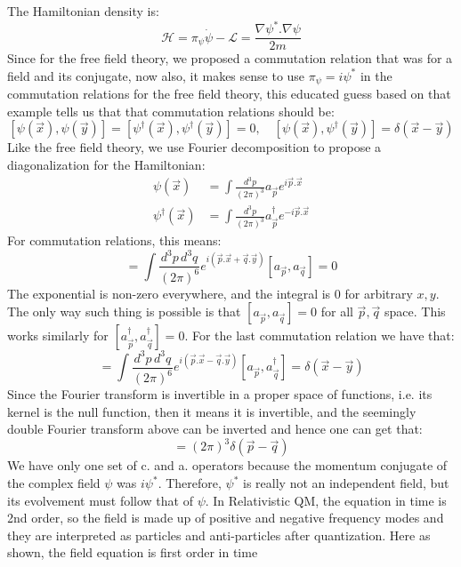 \documentclass{article}
\newcommand{\pdotx}{\vec{p}.\vec{x}}
\newcommand{\qdoty}{\vec{q}.\vec{y}}
\newcommand{\asp}{a_{\vec{p}}}
\newcommand{\asq}{a_{\vec{q}}}
\newcommand{\adp}{a_{\vec{p}}^\dagger}
\newcommand{\adq}{a_{\vec{q}}^\dagger}
\newcommand{\vecx}{\vec{x}}
\newcommand{\vecy}{\vec{y}}
\newcommand{\vecp}{\vec{p}}
\newcommand{\vecq}{\vec{q}}
\newcommand{\lagrangian}{\mathcal{L}}
\begin{document}
The Hamiltonian density is:
\begin{equation}
    \mathcal{H} = \pi_\psi \dot{\psi} - \lagrangian = \frac{\nabla\psi^* . \nabla \psi}{2m}
\end{equation}
Since for the free field theory, we proposed a commutation relation that was for a field and its conjugate, now also, it makes sense to use $\pi_\psi =i\psi^*$ in the commutation relations for the free field theory, this educated guess based on that example tells us that that commutation relations should be:
$$
[\psi(\vecx), \psi(\vecy)] = [\psi^\dagger(\vecx), \psi^\dagger(\vecy)] = 0, \quad [\psi(\vecx), \psi^\dagger(\vecy)] = \delta(\vecx - \vecy)
$$
Like the free field theory, we use Fourier decomposition to propose a diagonalization for the Hamiltonian:
\begin{equation}
\begin{split}
    \psi(\vecx) &= \int \frac{d^3p}{(2\pi)^3}\asp e^{i\pdotx}\\
    \psi^\dagger(\vecx) &= \int \frac{d^3p}{(2\pi)^3}\adp e^{-i\pdotx}
\end{split}
\end{equation}
For commutation relations, this means:
\begin{equation}
    [\psi(\vecx), \psi(\vecy)] = \int \frac{d^3p\, d^3 q}{(2\pi)^6}e^{i(\pdotx + \qdoty)}[\asp, \asq] = 0
\end{equation}
The exponential is non-zero everywhere, and the integral is $0$ for arbitrary $x,y$. The only way such thing is possible is that $[\asp, \asq]=0$ for all $\vecp,\vecq$ space. This works similarly for $[\adp, \adq]=0$. For the last commutation relation we have that:
\begin{equation}
    [\psi(\vecx), \psi^\dagger(\vecy)]= \int \frac{d^3p\, d^3 q}{(2\pi)^6}e^{i(\pdotx - \qdoty)}[\asp, \adq] = \delta(\vecx - \vecy)
\end{equation}
Since the Fourier transform is invertible in a proper space of functions, i.e. its kernel is the null function, then it means it is invertible, and the seemingly double Fourier transform above can be inverted and hence one can get that:
\begin{equation}
    [\asp, \adq] = (2\pi)^3\delta(\vecp - \vecq)
\end{equation}
We have only one set of  c. and a. operators because the momentum conjugate of the complex field $\psi$ was $i\psi^*$. Therefore, $\psi^*$ is really not an independent field, but its evolvement must follow that of $\psi$. In Relativistic QM, the equation in time is 2nd order, so the field is made up of positive and negative frequency modes and they are interpreted as particles and anti-particles after quantization. Here as shown, the field equation is first order in time
\end{document}
